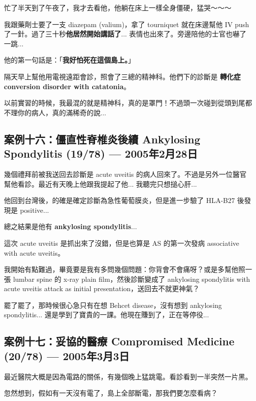 \documentclass[12pt,a4paper]{article}
\newenvironment{myquote}{%
    \begin{tcolorbox}[
        colback=quote_bg,
        colframe=emergency_gray,
        boxrule=0pt,
        leftrule=3pt,
        arc=0pt,
        left=10pt,
        right=10pt,
        top=8pt,
        bottom=8pt
    ]
    \itshape
}{%
    \end{tcolorbox}
}
\begin{document}
忙了半天到了午夜了，我才去看他，他躺在床上一樣全身僵硬，猛哭～～～

我跟藥劑士要了一支 diazepam (valium)，拿了 tourniquet 就在床邊幫他 IV push 了一針。過了三十秒\textbf{他居然開始講話了}... 表情也出來了。旁邊陪他的士官也嚇了一跳...

他的第一句話是：「\textbf{我好怕死在這個島上。}」

隔天早上幫他用電視遠距會診，照會了三總的精神科。他們下的診斷是 \textbf{轉化症 conversion disorder with catatonia}。

\begin{myquote}
以前實習的時候，我最混的就是精神科，真的是罩門！不過頭一次碰到從頭到尾都不理你的病人，真的滿稀奇的說...
\end{myquote}

\subsection{案例十六：僵直性脊椎炎後續 Ankylosing Spondylitis (19/78) — 2005年2月28日}

幾個禮拜前被我送回去診斷是 acute uveitis 的病人回來了。不過是另外一位醫官幫他看診。最近有天晚上他跟我提起了他... 我聽完只想搥心肝...

他回到台灣後，的確是確定診斷為急性葡萄膜炎，但是進一步驗了 HLA-B27 後發現是 positive...

總之結果是他有 \textbf{ankylosing spondylitis}...

這次 acute uveitis 是抓出來了沒錯，但是也算是 AS 的第一次發病 associative with acute uveitis。

我開始有點難過，畢竟要是我有多問幾個問題：你背會不會痛呀？或是多幫他照一張 lumbar spine 的 x-ray plain film，然後診斷變成了 ankylosing spondylitis with acute uveitis attack as initial presentation，送回去不就更神氣？

\begin{myquote}
罷了罷了，那時候很心急只有在想 Behcet disease，沒有想到 ankylosing spondylitis... 還是學到了寶貴的一課。他現在賺到了，正在等停役...
\end{myquote}

\subsection{案例十七：妥協的醫療 Compromised Medicine (20/78) — 2005年3月3日}

最近醫院大概是因為電路的關係，有幾個晚上猛跳電。看診看到一半突然一片黑。

忽然想到，假如有一天沒有電了，島上全部斷電，那我們要怎麼看病？
\end{document}
